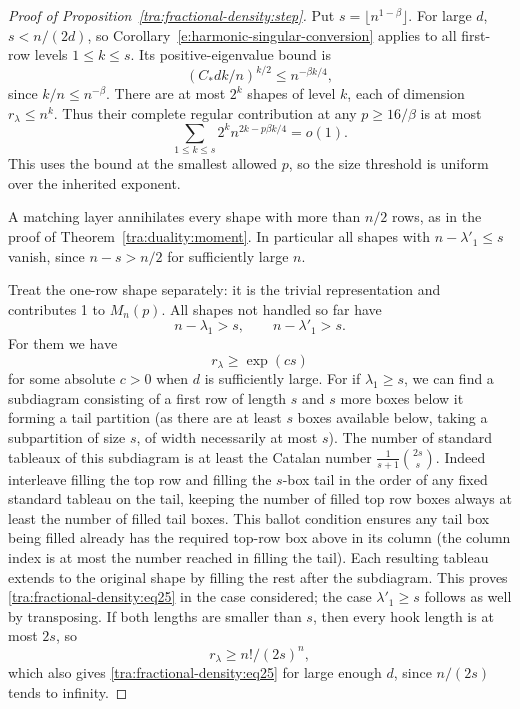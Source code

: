 \begin{proof}[Proof of Proposition~\ref{tra:fractional-density:step}]

\label{tra:fractional-density:sparse-irrep-transfer}
Put $s=\lfloor n^{1-\beta}\rfloor$. For large $d$,
$s<n/(2d)$, so Corollary~\ref{e:harmonic-singular-conversion}
applies to all first-row levels $1\le k\le s$. Its positive-eigenvalue
bound is
\begin{equation}
 (C_*dk/n)^{k/2}\le n^{-\beta k/4},
 \label{tra:fractional-density:eq23}
\end{equation}
since $k/n\le n^{-\beta}$. There are at most $2^k$ shapes of level
$k$, each of dimension $r_\lambda\le n^k$. Thus their complete
regular contribution at any $p\ge16/\beta$ is at most
\begin{equation}
 \sum_{1\le k\le s}2^kn^{2k-p\beta k/4}=o(1).
 \label{tra:fractional-density:eq24}
\end{equation}
This uses the bound at the smallest allowed $p$, so the size threshold
is uniform over the inherited exponent.

\label{tra:fractional-density:sign-annihilation-and-catalan-dimensions}
A matching layer annihilates every shape with more than $n/2$
rows, as in the proof of Theorem~\ref{tra:duality:moment}.
In particular all shapes with $n-\lambda'_1\le s$ vanish, since
$n-s>n/2$ for sufficiently large $n$.

Treat the one-row shape separately: it is the trivial representation and contributes 1 to \(M_n(p)\). All shapes not handled so far have
\[
 n-\lambda_1>s,\qquad n-\lambda'_1>s.
\]
For them we have
\begin{equation}
 r_\lambda\ge \exp(c s)
 \label{tra:fractional-density:eq25}
\end{equation}
for some absolute \(c>0\) when \(d\) is sufficiently large. For if \(\lambda_1\ge s\), we can find a subdiagram consisting of a first row of length \(s\) and \(s\) more boxes below it forming a tail partition (as there are at least \(s\) boxes available below, taking a subpartition of size \(s\), of width necessarily at most \(s\)). The number of standard tableaux of this subdiagram is at least the Catalan number \(\frac{1}{s+1}\binom{2s}{s}\). Indeed interleave filling the top row and filling the \(s\)-box tail in the order of any fixed standard tableau on the tail, keeping the number of filled top row boxes always at least the number of filled tail boxes. This ballot condition ensures any tail box being filled already has the required top-row box above in its column (the column index is at most the number reached in filling the tail). Each resulting tableau extends to the original shape by filling the rest after the subdiagram. This proves \eqref{tra:fractional-density:eq25} in the case considered; the case \(\lambda'_1\ge s\) follows as well by transposing. If both lengths are smaller than \(s\), then every hook length is at most \(2s\), so
\[
 r_\lambda\ge n!/(2s)^n,
\]
which also gives \eqref{tra:fractional-density:eq25} for large enough \(d\), since \(n/(2s)\) tends to infinity.


\end{proof}
